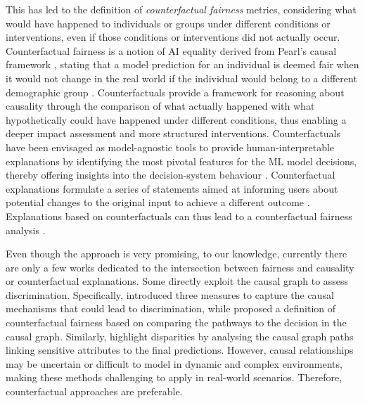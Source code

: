 \documentclass[letterpaper]{article} %
\begin{document}
This has led to the definition of \emph{counterfactual fairness} metrics, considering what would have happened to individuals or groups under different conditions or interventions, even if those conditions or interventions did not actually occur. Counterfactual fairness is a notion of AI equality derived from Pearl's causal framework \cite{pearl2009causality}, stating that a model prediction for an individual is deemed fair when it would not change in the real world if the individual would belong to a different demographic group \cite{NIPS2017_a486cd07,ijcai2019p199}. Counterfactuals provide a framework for reasoning about causality through the comparison of what actually happened with what hypothetically could have happened under different conditions, thus enabling a deeper impact assessment and more structured interventions. 
%
Counterfactuals have been envisaged as model-agnostic tools to provide human-interpretable explanations by identifying the most pivotal features for the ML model decisions, thereby offering insights into the decision-system behaviour \cite{10.1145/3236009,wachter2017counterfactual}. Counterfactual explanations formulate a series of statements aimed at informing users about potential changes to the original input to achieve a different outcome \cite{byrne2007rational}. Explanations based on counterfactuals can thus lead to a counterfactual fairness analysis \cite{artelt2019computation,karimi2021survey,guidotti2022counterfactual,verma2020counterfactual}.

Even though the approach is very promising, to our knowledge, currently there are only a few works dedicated to the intersection between fairness and causality or counterfactual explanations.
%
Some directly exploit the causal graph to assess discrimination. Specifically, \citet{Zhang_Bareinboim_2018} introduced three measures to capture the causal mechanisms that could lead to discrimination, while \citet{Chiappa_2019} proposed a definition of counterfactual fairness based on comparing the pathways to the decision in the causal graph. Similarly, \citet{pan2021explaining} highlight disparities by analysing the causal graph paths linking sensitive attributes to the final predictions. However, causal relationships may be uncertain or difficult to model in dynamic and complex environments, making these methods challenging to apply in real-world scenarios. Therefore, counterfactual approaches are preferable.
\end{document}
